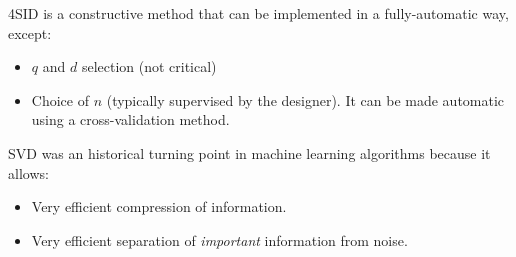 \begin{remark}
    4SID is a constructive method that can be implemented in a fully-automatic way, except:
    \begin{itemize}
        \item $q$ and $d$ selection (not critical)
        \item Choice of $n$ (typically supervised by the designer). It can be made automatic using a cross-validation method.
    \end{itemize}
\end{remark}

\begin{remark}
    SVD was an historical turning point in machine learning algorithms because it allows:
    \begin{itemize}
        \item Very efficient compression of information.
        \item Very efficient separation of \emph{important} information from noise.
    \end{itemize}
\end{remark}
